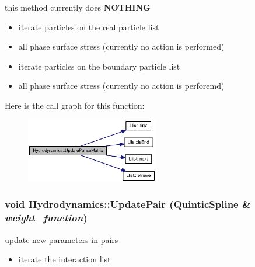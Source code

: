 this method currently does {\bf NOTHING} 



\begin{itemize}
\item iterate particles on the real particle list\end{itemize}


\begin{itemize}
\item all phase surface stress (currently no action is performed)\end{itemize}


\begin{itemize}
\item iterate particles on the boundary particle list\end{itemize}


\begin{itemize}
\item all phase surface stress (currently no action is perforemd) \end{itemize}


Here is the call graph for this function:\nopagebreak
\begin{figure}[H]
\begin{center}
\leavevmode
\includegraphics[width=164pt]{classHydrodynamics_a755853b07cbbc5b484d78a3e787d1ef_cgraph}
\end{center}
\end{figure}
\hypertarget{classHydrodynamics_cf0d749b11e8b8474dd204c6ea080235}{
\subsubsection[{UpdatePair}]{\setlength{\rightskip}{0pt plus 5cm}void Hydrodynamics::UpdatePair ({\bf QuinticSpline} \& {\em weight\_\-function})}}
\label{classHydrodynamics_cf0d749b11e8b8474dd204c6ea080235}


update new parameters in pairs 



\begin{itemize}
\item iterate the interaction list\end{itemize}



